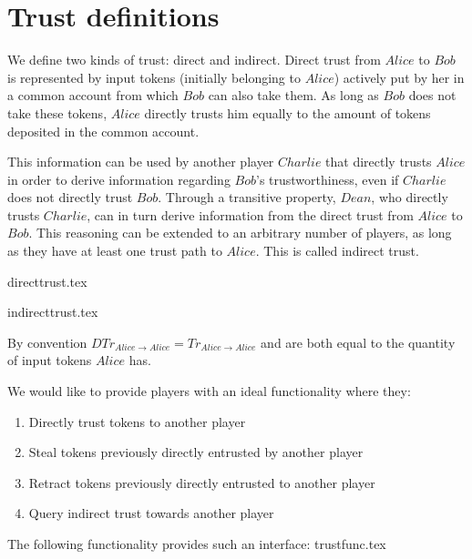 \section{Trust definitions}
  We define two kinds of trust: direct and indirect. Direct trust from $Alice$ to $Bob$ is
  represented by input tokens (initially belonging to $Alice$) actively put by her in a
  common account from which $Bob$ can also take them. As long as $Bob$ does not take these
  tokens, $Alice$ directly trusts him equally to the amount of tokens deposited in the
  common account.

  This information can be used by another player $Charlie$ that directly trusts $Alice$ in
  order to derive information regarding $Bob$'s trustworthiness, even if $Charlie$ does
  not directly trust $Bob$. Through a transitive property, $Dean$, who directly trusts
  $Charlie$, can in turn derive information from the direct trust from $Alice$ to $Bob$.
  This reasoning can be extended to an arbitrary number of players, as long as they have
  at least one trust path to $Alice$. This is called indirect trust.

  {directtrust.tex}

  {indirecttrust.tex}

  By convention $DTr_{Alice \rightarrow Alice} = Tr_{Alice \rightarrow Alice}$ and are
  both equal to the quantity of input tokens $Alice$ has.

  We would like to provide players with an ideal functionality where they:
  \begin{enumerate}
    \item Directly trust tokens to another player
    \item Steal tokens previously directly entrusted by another player
    \item Retract tokens previously directly entrusted to another player
    \item Query indirect trust towards another player
  \end{enumerate}
  The following functionality provides such an interface:
  {trustfunc.tex}
